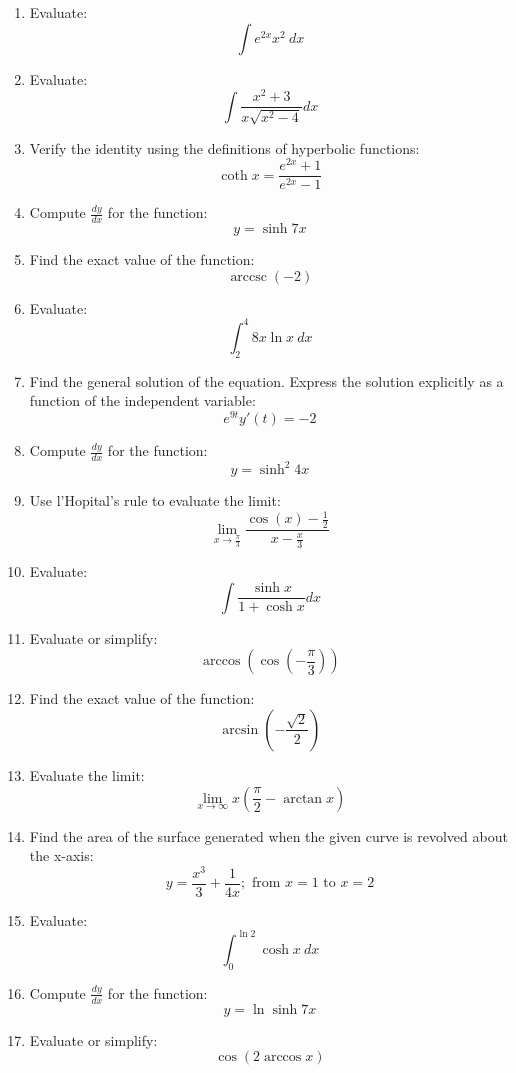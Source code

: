 \documentclass[fleqn]{article}
\DeclareMathOperator{\arccsc}{arccsc}
\begin{document}
\begin{multicols}{2}
\begin{enumerate}
\item Evaluate:
\[\int e^{2x}x^2\ dx\]

\item Evaluate:
\[\int\frac{x^2+3}{x\sqrt{x^2-4}}dx\]

\item Verify the identity using the definitions of hyperbolic functions:
\[\coth x=\frac{e^{2x}+1}{e^{2x}-1}\]

\item Compute \(\frac{dy}{dx}\) for the function:
\[y=\sinh 7x\]

\item Find the exact value of the function:
\[\arccsc(-2)\]

\item Evaluate:
\[\int_2^4 8x\ln x\ dx\]

\item Find the general solution of the equation. Express the solution explicitly as a function of the independent variable:
\[e^{9t}y'(t)=-2\]

\item Compute \(\frac{dy}{dx}\) for the function:
\[y=\sinh^2 4x\]

\item Use l'Hopital's rule to evaluate the limit:
\[\lim_{x\to\frac{\pi}{3}}\frac{\cos(x)-\frac{1}{2}}{x-\frac{x}{3}}\]

\item Evaluate:
\[\int\frac{\sinh x}{1+\cosh x}dx\]

\item Evaluate or simplify:
\[\arccos\left(\cos\left(-\frac{\pi}{3}\right)\right)\]

\item Find the exact value of the function:
\[\arcsin\left(-\frac{\sqrt{2}}{2}\right)\]

\item Evaluate the limit:
\[\lim_{x\to\infty}x\left(\frac{\pi}{2}-\arctan x\right)\]

\item Find the area of the surface generated when the given curve is revolved about the x-axis:
\[y=\frac{x^3}{3}+\frac{1}{4x};\text{ from }x=1\text{ to }x=2\]

\item Evaluate:
\[\int_0^{\ln 2}\cosh x\ dx\]

\item Compute \(\frac{dy}{dx}\) for the function:
\[y=\ln\sinh 7x\]

\item Evaluate or simplify:
\[\cos(2\arccos x)\]


\end{enumerate}
\end{multicols}
\end{document}
